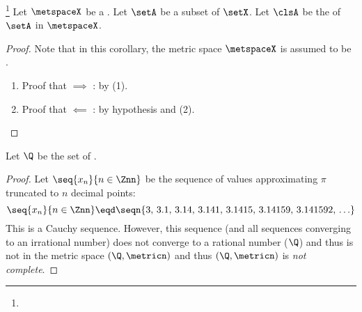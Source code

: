 \begin{corollary}
\footnote{
  }
\label{cor:comcomcls}
Let $\metspaceX$ be a .
Let $\setA$ be a subset of $\setX$.
Let $\clsA$ be the   of $\setA$ in $\metspaceX$.
\end{corollary}
\begin{proof}
Note that in this corollary, the metric space $\metspaceX$ is assumed to be .
\begin{enumerate}
  \item Proof that  $\implies$ : by  (1).
  \item Proof that  $\impliedby$ : by  hypothesis and  (2).
\end{enumerate}
\end{proof}

\begin{example}
Let $\Q$ be the set of .
\end{example}
\begin{proof}
Let $\seq{x_n}{n\in\Znn}$ be the sequence of values approximating $\pi$ truncated to $n$
decimal points:
  \[ \seq{x_n}{n\in\Znn} \eqd \seqn{3,\, 3.1,\, 3.14,\, 3.141,\, 3.1415,\, 3.14159,\, 3.141592,\,\ldots} \]
This is a Cauchy sequence.
However, this sequence (and all sequences converging to an irrational number)
does not converge to a rational number ($\Q$) and thus is not in
the metric space $(\Q,\metricn)$ and thus $(\Q,\metricn)$ is {\em not complete}.
\end{proof}

